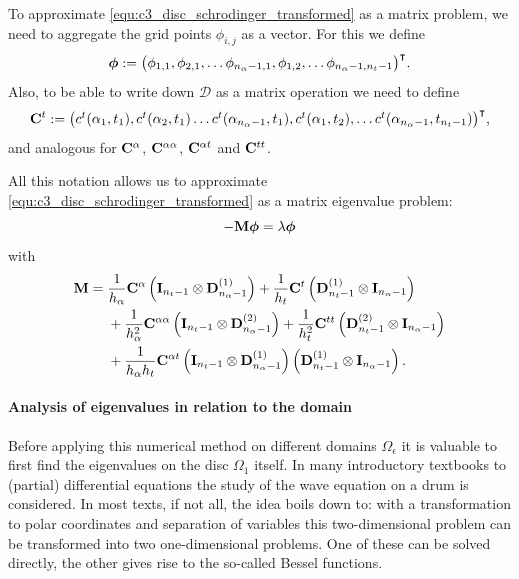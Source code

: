 To approximate \eqref{equ:c3_disc_schrodinger_transformed} as a matrix problem, we need to aggregate the grid points $\phi_{i,j}$ as a vector. For this we define
$$
    \vb*{\phi} := {\begin{pmatrix}
            \phi_{1,1}, \phi_{2,1}, \dots \phi_{n_\alpha-1, 1}, \phi_{1,2}, \dots \phi_{n_\alpha-1, n_t-1}
        \end{pmatrix}}^\intercal\text{.}
$$
Also, to be able to write down $\mathcal{D}$ as a matrix operation we need to define
$$
    \vb{C}^{t} := {\begin{pmatrix}
            c^{t}(\alpha_1, t_1), c^{t}(\alpha_2, t_1) \dots c^{t}(\alpha_{n_\alpha-1}, t_1), c^{t}(\alpha_1, t_2), \dots c^{t}({\alpha_{n_\alpha-1}, t_{n_t-1}})
        \end{pmatrix}}^\intercal\text{,}
$$
and analogous for $\vb{C}^{\alpha}$, $\vb{C}^{\alpha\alpha}$, $\vb{C}^{\alpha t}$ and $\vb{C}^{t t}$.

All this notation allows us to approximate \eqref{equ:c3_disc_schrodinger_transformed} as a matrix eigenvalue problem:
$$
    -\vb{M} \vb*{\phi} = \lambda \vb*{\phi}
$$
with
\begin{align*}
    \vb{M} = {} & \frac{1}{h_\alpha} \vb{C}^{\alpha} \left(\vb{I}_{n_t - 1}\otimes \vb{D}^{(1)}_{n_\alpha - 1} \right) + \frac{1}{h_t} \vb{C}^{t} \left(\vb{D}^{(1)}_{n_t - 1}  \otimes \vb{I}_{n_\alpha - 1}\right)                \\
                & {} + \frac{1}{h_\alpha^2} \vb{C}^{\alpha\alpha} \left(\vb{I}_{n_t - 1}\otimes \vb{D}^{(2)}_{n_\alpha - 1}\right) + \frac{1}{h_t^2} \vb{C}^{tt} \left(\vb{D}^{(2)}_{n_t - 1}  \otimes \vb{I}_{n_\alpha - 1}\right) \\
                & {} + \frac{1}{h_\alpha h_t} \vb{C}^{\alpha t} \left(\vb{I}_{n_t - 1}\otimes \vb{D}^{(1)}_{n_\alpha - 1} \right) \left( \vb{D}^{(1)}_{n_t - 1}  \otimes \vb{I}_{n_\alpha - 1} \right)\text{.}
\end{align*}

\paragraph{Analysis of eigenvalues in relation to the domain}

Before applying this numerical method on different domains $\Omega_\epsilon$ it is valuable to first find the eigenvalues on the disc $\Omega_1$ itself. In many introductory textbooks to (partial) differential equations the study of the wave equation on a drum is considered. In most texts, if not all, the idea boils down to: with a transformation to polar coordinates and separation of variables this two-dimensional problem can be transformed into two one-dimensional problems. One of these can be solved directly, the other gives rise to the so-called Bessel functions.

